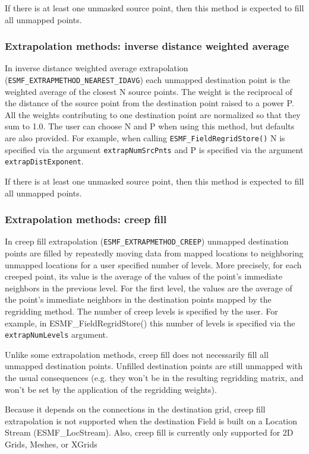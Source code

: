 If there is at least one unmasked source point, then this method is expected to fill all unmapped points. 

\subsubsection{Extrapolation methods: inverse distance weighted average}\label{sec:extrapolation:nearestidavg}
In inverse distance weighted average extrapolation ({\tt ESMF\_EXTRAPMETHOD\_NEAREST\_IDAVG}) each unmapped 
destination point is the weighted average of the closest N source points. The weight is 
the reciprocal of the distance of the source point from the destination point raised to a power P.
All the weights contributing to one destination point are normalized so that they sum to 1.0. 
The user can choose N and P when using this method, but defaults are also provided. For example, when 
calling {\tt ESMF\_FieldRegridStore()} N is specified via the argument {\tt extrapNumSrcPnts} and 
P is specified via the argument {\tt extrapDistExponent}.  

If there is at least one unmasked source point, then this method is expected to fill all unmapped points. 

\subsubsection{Extrapolation methods: creep fill}\label{sec:extrapolation:creep}
In creep fill extrapolation ({\tt ESMF\_EXTRAPMETHOD\_CREEP}) unmapped destination points are filled by 
repeatedly moving data from mapped locations to neighboring unmapped locations for a user specified 
number of levels. More precisely, for each creeped point, its value is the average of the values of the 
point's immediate neighbors in the previous level. For the first level, the values are the average of the 
point's immediate neighbors in the destination points mapped by the regridding method. The number of creep levels
is specified by the user. For example, in ESMF\_FieldRegridStore() this number of levels is specified 
via the {\tt extrapNumLevels} argument. 

Unlike some extrapolation methods, creep fill does not necessarily 
fill all unmapped destination points. Unfilled destination points are still unmapped with the usual 
consequences (e.g. they won't be in the resulting regridding matrix, and won't be set by the application 
of the regridding weights).

Because it depends on the connections in the destination grid, creep fill extrapolation is not supported when the 
destination Field is built on a Location Stream (ESMF\_LocStream). Also, creep fill is currently only supported for 
2D Grids, Meshes, or XGrids

